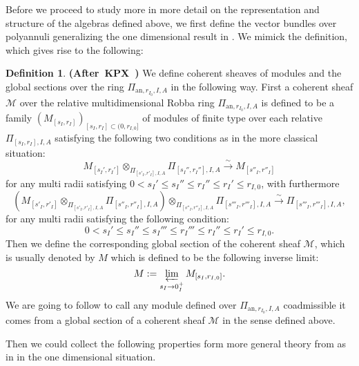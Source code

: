 \documentclass[12pt]{amsart}
\theoremstyle{definition}
\newtheorem{definition}[theorem]{Definition}
\numberwithin{equation}{section}
\begin{document}
\indent Before we proceed to study more in more detail on the representation and structure of the algebras defined above, we first define the vector bundles over polyannuli generalizing the one dimensional result in \cite[Definition 2.1.3]{KPX}. We mimick the definition, which gives rise to the following:


\begin{definition} \mbox{\bf{(After KPX \cite[Definition 2.1.3]{KPX})}}
We define coherent sheaves of modules and the global sections over the ring $\Pi_{\mathrm{an},r_{I_0},I,A}$ in the following way. First a coherent sheaf $\mathcal{M}$ over the relative multidimensional Robba ring $\Pi_{\mathrm{an},r_{I_0},I,A}$ is defined to be a family $(M_{[s_I,r_I]})_{[s_I,r_I]\subset (0,r_{I,0}]}$	of modules of finite type over each relative $\Pi_{[s_I,r_I],I,A}$ satisfying the following two conditions as in the more classical situation:
\begin{displaymath}
M_{[s_I',r_I']}\otimes_{\Pi_{[s'_I,r'_I],I,A}}\Pi_{[s_I'',r_I''],I,A}\overset{\sim}{\rightarrow} M_{[s''_I,r''_I]}	
\end{displaymath}
for any multi radii satisfying $0<s_I'\leq s_I''\leq r_I''\leq r_I'\leq r_{I,0}$, with furthermore 
\begin{displaymath}
(M_{[s'_I,r'_I]}\otimes_{\Pi_{[s'_I,r'_I],I,A}}\Pi_{[s''_I,r''_I],I,A}	)\otimes_{\Pi_{[s''_I,r''_I],I,A}}\Pi_{[s'''_I,r'''_I],I,A}\overset{\sim}{\rightarrow}\Pi_{[s'''_I,r'''_I],I,A},
\end{displaymath}
for any multi radii satisfying the following condition:
\begin{displaymath}
0<s_I'\leq s_I''\leq s_I'''\leq r_I'''\leq r_I''\leq r_I'\leq r_{I,0}.	
\end{displaymath}
Then we define the corresponding global section of the coherent sheaf $\mathcal{M}$, which is usually denoted by $M$ which is defined to be the following inverse limit:
\begin{displaymath}
M:=\varprojlim_{s_I\rightarrow 0_I^+} M_{[s_I,r_{I,0}]}.	
\end{displaymath}
We are going to follow \cite[Definition 2.1.3]{KPX} to call any module defined over $\Pi_{\mathrm{an},r_{I_0},I,A}$ coadmissible it comes from a global section of a coherent sheaf $\mathcal{M}$ in the sense defined above. 
\end{definition}








\indent Then we could collect the following properties form more general theory from \cite{ST1} as in \cite[Lemma 2.1.4]{KPX} in the one dimensional situation.
\end{document}
